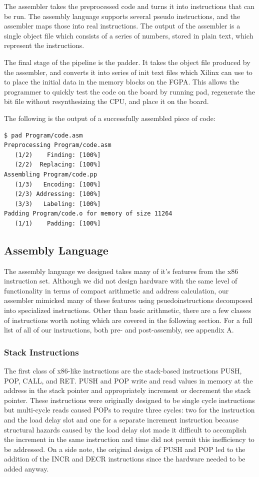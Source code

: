 \documentclass[onecolumn]{IEEEtran}
\begin{document}
The assembler takes the preprocessed code and turns it into instructions that can be run.  The assembly language supports several pseudo instructions, and the assembler maps those into real instructions.  The output of the assembler is a single object file which consists of a series of numbers, stored in plain text, which represent the instructions.

The final stage of the pipeline is the padder. It takes the object file produced by the assembler, and converts it into series of init text files which Xilinx can use to to place the initial data in the memory blocks on the FGPA.  This allows the programmer to quickly test the code on the board by running pad, regenerate the bit file without resynthesizing the CPU, and place it on the board.

The following is the output of a successfully assembled piece of code:

\begin{verbatim}
$ pad Program/code.asm
Preprocessing Program/code.asm
   (1/2)    Finding: [100%]
   (2/2)  Replacing: [100%]
Assembling Program/code.pp
   (1/3)   Encoding: [100%]
   (2/3) Addressing: [100%]
   (3/3)   Labeling: [100%]
Padding Program/code.o for memory of size 11264
   (1/1)    Padding: [100%]
\end{verbatim}

\subsection{Assembly Language}
The assembly language we designed takes many of it's features from the x86 instruction set.  Although we did not design hardware with the same level of functionality in terms of compact arithmetic and address calculation, our assembler mimicked many of these features using psuedoinstructions decomposed into specialized instructions.  Other than basic arithmetic, there are a few classes of instructions worth noting which are covered in the following section.  For a full list of all of our instructions, both pre- and post-assembly, see appendix A.

\subsubsection{Stack Instructions}
The first class of x86-like instructions are the stack-based instructions PUSH, POP, CALL, and RET.  PUSH and POP write and read values in memory at the address in the stack pointer and appropriately increment or decrement the stack pointer.  These instructions were originally designed to be single cycle instructions but multi-cycle reads caused POPs to require three cycles: two for the instruction and the load delay slot and one for a separate increment instruction because structural hazards caused by the load delay slot made it difficult to accomplish the increment in the same instruction and time did not permit this inefficiency to be addressed.  On a side note, the original design of PUSH and POP led to the addition of the INCR and DECR instructions since the hardware needed to be added anyway.
\end{document}
